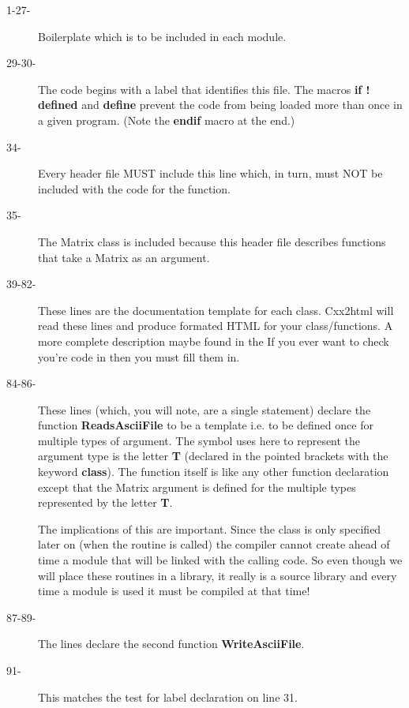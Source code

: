 \begin{description}
\item[1-27-] Boilerplate which is to be included in each module.

\item[29-30-]	The code begins with a label that identifies this file. The macros
{\bf if ! defined} and {\bf define} prevent the code from being
loaded more than once in a given program. (Note the {\bf endif} macro at the
end.)

\item[34-] Every header file MUST include this line which, in turn, must NOT be
included with the code for the function.

\item[35-] The Matrix class is included because this header file describes functions
that take a Matrix as an argument.

\item[39-82-]  These lines are the documentation template for each class.  Cxx2html
will read these lines and produce formated HTML for your class/functions.
A more complete description maybe found in the 
If you ever want to check you're code in then you must fill them in.

\item[84-86-] These lines (which, you will note, are a single statement) declare the
function {\bf ReadsAsciiFile} to be a template i.e. to be
defined once for multiple types of argument. The symbol uses here to represent
the argument type is the letter {\bf T} (declared in the pointed brackets with
the keyword {\bf class}).
The function itself is like any other
function declaration except that the Matrix argument
is defined for the multiple types represented by the letter {\bf T}.

The implications of this are important. Since the class is only specified
later on (when the routine is called) the compiler cannot create ahead of time
a module that will be linked with the calling code.  So even though we will 
place these routines in a library, it really is a source library and every
time a module is used it must be compiled at that time!
  
\item[87-89-] The lines declare the second function {\bf WriteAsciiFile}.

\item[91-] This matches the test for label declaration on line 31.
\end{description}


